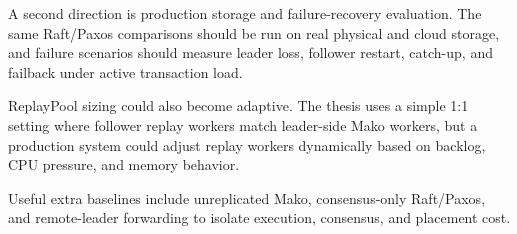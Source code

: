 A second direction is production storage and failure-recovery evaluation. The
same Raft/Paxos comparisons should be run on real physical and cloud storage,
and failure scenarios should measure leader loss, follower restart, catch-up,
and failback under active transaction load.

ReplayPool sizing could also become adaptive. The thesis uses a simple 1:1
setting where follower replay workers match leader-side Mako workers, but a
production system could adjust replay workers dynamically based on backlog,
CPU pressure, and memory behavior.

Useful extra baselines include unreplicated Mako, consensus-only Raft/Paxos,
and remote-leader forwarding to isolate execution, consensus, and placement
cost.
